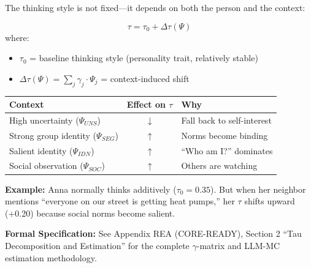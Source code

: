 The thinking style is not fixed---it depends on both the person and the context:

\begin{definition}
\begin{equation}
\tau = \tau_0 + \Delta\tau(\Psi)
\label{eq:tau-decomposition}
\end{equation}
where:
\begin{itemize}[nosep]
\item $\tau_0$ = baseline thinking style (personality trait, relatively stable)
\item $\Delta\tau(\Psi) = \sum_j \gamma_j \cdot \Psi_j$ = context-induced shift
\end{itemize}
\end{definition}

\begin{intuition}
\begin{center}
\begin{tabular}{lcp{6cm}}
\toprule
\textbf{Context} & \textbf{Effect on $\tau$} & \textbf{Why}\\
\midrule
High uncertainty ($\Psi_{UNS}$) & $\downarrow$ & Fall back to self-interest\\
Strong group identity ($\Psi_{SEG}$) & $\uparrow$ & Norms become binding\\
Salient identity ($\Psi_{IDN}$) & $\uparrow$ & ``Who am I?'' dominates\\
Social observation ($\Psi_{SOC}$) & $\uparrow$ & Others are watching\\
\bottomrule
\end{tabular}
\end{center}

\textbf{Example:} Anna normally thinks additively ($\tau_0 = 0.35$). But when
her neighbor mentions ``everyone on our street is getting heat pumps,'' her
$\tau$ shifts upward (+0.20) because social norms become salient.
\end{intuition}

\begin{cross-reference}
\textbf{Formal Specification:} See Appendix REA (CORE-READY), Section 2 ``Tau Decomposition
and Estimation'' for the complete $\gamma$-matrix and LLM-MC estimation methodology.
\end{cross-reference}



